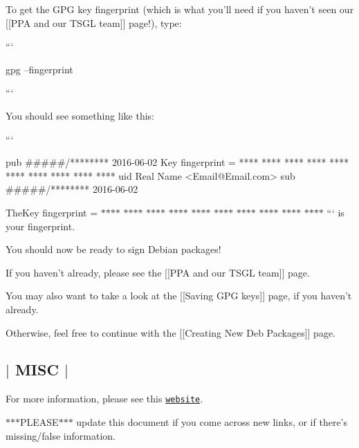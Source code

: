 To get the G\-P\-G key fingerprint (which is what you'll need if you haven't seen our \mbox{[}\mbox{[}P\-P\-A and our T\-S\-G\-L team\mbox{]}\mbox{]} page!), type\-:

``` \begin{DoxyVerb}gpg --fingerprint
\end{DoxyVerb}


```

You should see something like this\-:

``` \begin{DoxyVerb}pub   #####/******** 2016-06-02
      Key fingerprint = **** **** **** **** ****  **** **** **** **** ****
uid                  Real Name <Email@Email.com>
sub   #####/******** 2016-06-02
\end{DoxyVerb}


{\ttfamily  The}Key fingerprint = $\ast$$\ast$$\ast$$\ast$ $\ast$$\ast$$\ast$$\ast$ $\ast$$\ast$$\ast$$\ast$ $\ast$$\ast$$\ast$$\ast$ $\ast$$\ast$$\ast$$\ast$ $\ast$$\ast$$\ast$$\ast$ $\ast$$\ast$$\ast$$\ast$ $\ast$$\ast$$\ast$$\ast$ $\ast$$\ast$$\ast$$\ast$ $\ast$$\ast$$\ast$$\ast$ ``` is your fingerprint.

You should now be ready to sign Debian packages!

If you haven't already, please see the \mbox{[}\mbox{[}P\-P\-A and our T\-S\-G\-L team\mbox{]}\mbox{]} page.

You may also want to take a look at the \mbox{[}\mbox{[}Saving G\-P\-G keys\mbox{]}\mbox{]} page, if you haven't already.

Otherwise, feel free to continue with the \mbox{[}\mbox{[}Creating New Deb Packages\mbox{]}\mbox{]} page. 

 \subsection*{$\vert$ M\-I\-S\-C $\vert$ }

For more information, please see this \href{http://ubuntuforums.org/showthread.php?t=680292}{\tt website}.

$\ast$$\ast$$\ast$\-P\-L\-E\-A\-S\-E$\ast$$\ast$$\ast$ update this document if you come across new links, or if there's missing/false information. 